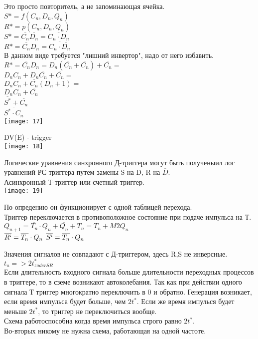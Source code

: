 Это просто повторитель, а не запоминающая ячейка.\\
$S* = f(C_n, D_n,Q_n) $\\
$R* = p(C_n, D_n,Q_n) $\\
$S* = \overline{C_n} \overline{D_n} = \overline{C_n \cdot D_n} $\\
$R* = \overline{C_n} D_n = \overline{C_n \cdot \overline{D_n}} $\\
В данном виде требуется "лишний инвертор", надо от него избавить.\\
$R* = \overline{C_n} D_n = D_n(\overline{C_n} + \overline{C_n}) + \overline{C_n} = $\\
$D_n C_n  + D_n \overline{ C_n} + \overline{C_n} = $\\
$ D_n C_n  + \overline{C_n}(D_n + 1) = $\\
$D_n C_n + \overline{C_n}  $\\
$\overline{S^*}  + \overline{C_n}$ \\
$ \overline{S^* \cdot C_n}$\\

\texttt{[image: 17]}

DV(E) - trigger\\
\texttt{[image: 18]}

Логические уравнения синхронного Д-триггера могут быть полученыил лог уравнений РС-триггера путем замены S на D, R на $\overline{D}$.\\

Асинхронный Т-триггер или счетный триггер.\\
\texttt{[image: 19]}

По опредению он функционирует с одной таблицей перехода. \\
Триггер переключается в противоположное состояние при подаче импульса на Т.\\

$Q_{n+1} = \overline{T_n} \cdot Q_n + \overline{Q_n} + T_n = T_n +M2 Q_n $\\

$\overline{R`} = \overline{T_n} \cdot Q_n$
$\overline{S`} = \overline{T_n} \cdot Q_n$

Значения сигналов не совпадают с Д-триггером, здесь R,S не инверсные.
$t_{u} => 2t^*_{zaderSR}$\\

Если длительность входного сигнала больше длительности переходных процессов в триггере, то в сземе возникают автоколебания.
Так как при действии одного сигнала Т триггер многократно переключить в 0 и обратно.
Генерация возникает, если время импульса будет больше, чем $2t^*$.
Если же время импулься будет меньше $2t^*$, то триггер не переключиться вообще.\\
Схема работоспособна когда время импульса строго равно  $2t^*$.\\
Во-вторых никому не нужна схема, работающая на одной частоте.\\














